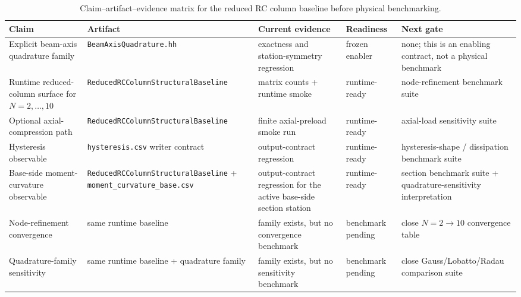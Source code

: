 \begin{table}[htbp]
  \centering
  \caption{Claim--artifact--evidence matrix for the reduced RC column baseline
  before physical benchmarking.}
  \label{tab:reduced-rc-column-claim-trace}
  \scriptsize
  \setlength{\tabcolsep}{3pt}
  \begin{tabularx}{\textwidth}{@{}p{}p{}p{}p{}X@{}}
    \toprule
    \textbf{Claim} & \textbf{Artifact} & \textbf{Current evidence} &
    \textbf{Readiness} & \textbf{Next gate} \\
    \midrule
    Explicit beam-axis quadrature family
    & \texttt{BeamAxisQuadrature.hh}
    & exactness and station-symmetry regression
    & frozen enabler
    & none; this is an enabling contract, not a physical benchmark \\[0.4mm]

    Runtime reduced-column surface for \(N=2,\dots,10\)
    & \texttt{ReducedRCColumnStructuralBaseline}
    & matrix counts + runtime smoke
    & runtime-ready
    & node-refinement benchmark suite \\[0.4mm]

    Optional axial-compression path
    & \texttt{ReducedRCColumnStructuralBaseline}
    & finite axial-preload smoke run
    & runtime-ready
    & axial-load sensitivity suite \\[0.4mm]

    Hysteresis observable
    & \texttt{hysteresis.csv} writer contract
    & output-contract regression
    & runtime-ready
    & hysteresis-shape / dissipation benchmark suite \\[0.4mm]

    Base-side moment-curvature observable
    & \texttt{ReducedRCColumnStructuralBaseline} +
      \texttt{moment\_curvature\_base.csv}
    & output-contract regression for the active base-side section station
    & runtime-ready
    & section benchmark suite + quadrature-sensitivity interpretation \\[0.4mm]

    Node-refinement convergence
    & same runtime baseline
    & family exists, but no convergence benchmark
    & benchmark pending
    & close \(N=2 \rightarrow 10\) convergence table \\[0.4mm]

    Quadrature-family sensitivity
    & same runtime baseline + quadrature family
    & family exists, but no sensitivity benchmark
    & benchmark pending
    & close Gauss/Lobatto/Radau comparison suite \\
    \bottomrule
  \end{tabularx}
\end{table}

